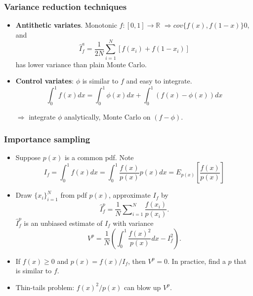 \documentclass[bigger,handout]{beamer}
\newenvironment{stepitemize}{\begin{itemize}[<+->]}{\end{itemize} }
\begin{document}
\begin{frame}%

\frametitle{Variance reduction techniques}

\begin{stepitemize}
\item \textbf{Antithetic variates}. Monotonic $f:\left[ 0,1\right]
\rightarrow \mathbb{R}$\newline
$\Rightarrow cov\{f(x),f(1-x)\}$\TEXTsymbol{<}$0$, and%
\begin{equation*}
\hat{I}_{f}^{a}=\frac{1}{2N}\sum_{i=1}^{N}\left[ f(x_{i})+f(1-x_{i})\right]
\end{equation*}%
has lower variance than plain Monte Carlo. {\small \bigskip }

\item \textbf{Control variates}: $\phi $ is similar to $f$ and easy to
integrate. 
\begin{equation*}
\int_{0}^{1}f(x)dx=\int_{0}^{1}\phi (x)dx+\int_{0}^{1}(f(x)-\phi (x))dx
\end{equation*}

$\Rightarrow $ integrate $\phi $ analytically, Monte Carlo on $(f-\phi )$.
\end{stepitemize}

\end{frame}%

\begin{frame}%

\frametitle{Importance sampling}

\begin{stepitemize}
\item Suppose $p(x)$ is a common pdf. Note 
\begin{equation*}
I_{f}=\int_{0}^{1}f(x)dx=\int_{0}^{1}\frac{f(x)}{p(x)}p(x)dx=E_{p(x)}\left[ 
\frac{f(x)}{p(x)}\right]
\end{equation*}

\item Draw $\{x_{i}\}_{i=1}^{N}$ from pdf $p(x)$, approximate $I_{f}$ by 
\begin{equation*}
\hat{I}_{f}^{p}=\frac{1}{N}\sum\nolimits_{i=1}^{N}\frac{f(x_{i})}{p(x_{i})}.
\end{equation*}%
$\hat{I}_{f}^{p}$ is an unbiased estimate of $I_{f}$ with variance 
\begin{equation*}
V^{p}=\frac{1}{N}\left( \int_{0}^{1}\frac{f(x)^{2}}{p(x)}dx-I_{f}^{2}\right)
.
\end{equation*}

\item If $f(x)\geq 0$ and $p(x)=f(x)/I_{f}$, then $V^{p}=0$. \newline
In practice, find a $p$ that is similar to $f$.

\item Thin-tails problem: $f(x)^{2}/p(x)$ can blow up $V^{p}$.
\end{stepitemize}


\end{frame}%
\end{document}
